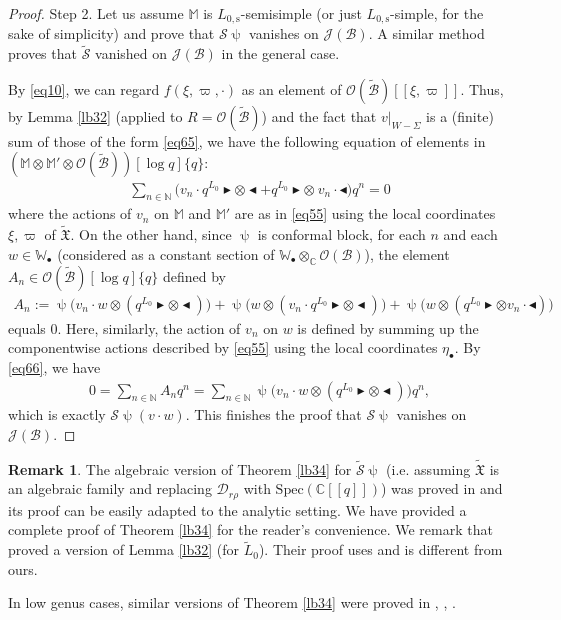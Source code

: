 \documentclass[12pt,a4paper,notitlepage]{article}
\theoremstyle{definition}
\newtheorem{rem}[df]{Remark}
\theoremstyle{plain}
\newcommand{\fk}{\mathfrak}
\newcommand{\mc}{\mathcal}
\newcommand{\wtd}{\widetilde}
\newcommand{\scr}{\mathscr}
\newcommand{\blt}{\bullet}
\newcommand{\Wbb}{\mathbb W}
\newcommand{\Mbb}{\mathbb M}
\newcommand{\Cbb}{\mathbb C}
\newcommand{\Nbb}{\mathbb N}
\newcommand{\btl}{\blacktriangleleft}
\newcommand{\btr}{\blacktriangleright}
\newcommand{\Lss}{{L_{0,\mathrm{s}}}}
\numberwithin{equation}{section}
\begin{document}
\begin{proof}
	
Step 2. Let us assume $\Mbb$ is $\Lss$-semisimple (or just $\Lss$-simple, for the sake of simplicity) and prove that $\mc S\uppsi$ vanishes on $\scr J(\mc B)$. A similar method proves that $\wtd{\mc S}$ vanished on $\scr J(\mc B)$ in  the general case. 

By \eqref{eq10}, we can regard $f(\xi,\varpi,\cdot)$ as an element of $\scr O(\wtd{\mc B})[[\xi,\varpi]]$. Thus, by Lemma \ref{lb32} (applied to $R=\scr O(\wtd{\mc B})$) and the fact that $v|_{W-\Sigma}$ is a (finite) sum of those of the form \eqref{eq65}, we have the following equation of elements in $(\Mbb\otimes\Mbb'\otimes \scr O(\wtd{\mc B}))[\log q]\{q\}$:
	\begin{align}
	\sum_{n\in\Nbb}\big(v_{n}\cdot q^{L_0}\btr\otimes\btl+ q^{L_0}\btr\otimes~ v_{n}\cdot\btl\big)q^{n} =0\label{eq66}
	\end{align}
	where the actions of $v_{n}$ on $\Mbb$ and $\Mbb'$ are as in \eqref{eq55} using the  local coordinates $\xi,\varpi$ of $\wtd{\fk X}$. On the other hand, since $\uppsi$ is  conformal block, for each $n$ and each $w\in\Wbb_\blt$ (considered as a constant section of $\Wbb_\blt\otimes_\Cbb\scr O(\mc B)$), the element $A_{n}\in\scr O(\wtd{\mc B})[\log q]\{q\}$ defined by
	\begin{align*}
	A_{n}:=\uppsi\big(v_{n}\cdot w\otimes (q^{L_0}\btr\otimes\btl)\big)+\uppsi\big(w\otimes (v_n\cdot q^{L_0}\btr\otimes\btl)\big)+\uppsi\big(w\otimes ( q^{L_0}\btr\otimes v_n\cdot\btl)\big)
	\end{align*}
	equals $0$. Here, similarly, the action of $v_{n}$ on $w$ is defined by summing up the componentwise actions described by \eqref{eq55} using the local coordinates $\eta_\blt$.  By \eqref{eq66}, we have
	\begin{align*}
	0=\sum_{n\in\Nbb}A_{n}q^{n}=\sum_{n\in\Nbb}\uppsi\big(v_{n}\cdot w\otimes (q^{L_0}\btr\otimes\btl)\big)q^n,
	\end{align*}
	which is exactly $\mc S\uppsi(v\cdot w)$. This finishes the proof that $\mc S\uppsi$ vanishes on $\scr J(\mc B)$.
\end{proof}



\begin{rem}
The algebraic version of  Theorem \ref{lb34} for $\wtd{\mc S}\uppsi$ (i.e. assuming $\wtd{\fk X}$ is an algebraic family and replacing $\mc D_{r\rho}$ with $\mathrm{Spec}(\Cbb[[q]])$) was proved in \cite[Thm. 8.5.1]{DGT19b} and its proof can be easily adapted to the analytic setting. We have provided a complete proof of Theorem \ref{lb34} for the reader's convenience. We remark that \cite{DGT19b}  proved a version of Lemma \ref{lb32} (for $\wtd L_0$). Their proof uses \cite[Lemma 8.7.1]{NT05} and is different from ours.

In low genus cases, similar versions of Theorem \ref{lb34} were proved in \cite[Prop. 4.3.6]{Zhu96}, \cite[Thm. 1.4]{Hua05a}, \cite[Prop. 3.6]{Hua05b}.
\end{rem}
\end{document}
